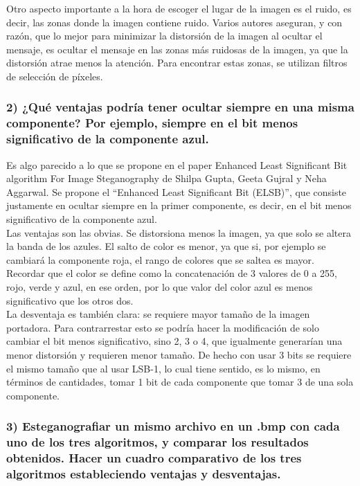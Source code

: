 \documentclass[a4paper,10pt]{article}
\begin{document}
Otro aspecto importante a la hora de escoger el lugar de la imagen es el ruido, es decir, las zonas donde la imagen contiene ruido. Varios autores aseguran, y con razón, que lo mejor 
para minimizar la distorsión de la imagen al ocultar el mensaje, es ocultar el mensaje en las zonas más ruidosas de la imagen, ya que la distorsión atrae menos la atención. Para 
encontrar estas zonas, se utilizan filtros de selección de píxeles.

\subsubsection*{ 2) ¿Qué ventajas podría tener ocultar siempre en una misma componente? Por ejemplo, siempre
en el bit menos significativo de la componente azul.}

Es algo parecido a lo que se propone en el paper Enhanced Least Significant Bit algorithm For Image Steganography de 
Shilpa Gupta, Geeta Gujral y Neha Aggarwal. Se propone el “Enhanced Least Significant Bit (ELSB)”, que consiste justamente en ocultar siempre en 
la primer componente, es decir, en el bit menos significativo de la componente azul.\\

Las ventajas son las obvias. Se distorsiona menos la imagen, ya que solo se altera la banda de los azules. El salto de color es menor, ya que si, por ejemplo se 
cambiará la componente roja, el rango de colores que se saltea es mayor. Recordar que el color se define como la concatenación de 3 valores de 0 a 255, rojo, verde y azul, en 
ese orden, por lo que valor del color azul es menos significativo que los otros dos.\\

La desventaja es también clara: se requiere mayor tamaño de la imagen portadora. Para contrarrestar esto se podría hacer la modificación de solo
cambiar el bit menos significativo, sino 2, 3 o 4, que igualmente generarían una menor distorsión y requieren menor tamaño. De hecho con usar 3 bits se requiere el mismo 
tamaño que al usar LSB-1, lo cual tiene sentido, es lo mismo, en términos de cantidades, tomar 1 bit de cada componente que 
tomar 3 de una sola componente.\\

\subsubsection*{ 3) Esteganografiar un mismo archivo en un .bmp con cada uno de los tres algoritmos, y comparar
los resultados obtenidos. Hacer un cuadro comparativo de los tres algoritmos estableciendo ventajas y desventajas.}
\end{document}
